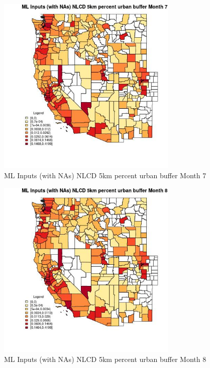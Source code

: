 \clearpage 

\begin{figure} 
\centering  
\includegraphics[width=0.77\textwidth]{Code_Outputs/Report_ML_input_PM25_Step4_part_e_de_duplicated_aves_compiled_2019-05-21wNAs_CountyNLCD_5km_percent_urban_buffermedianMonth7.jpg} 
\caption{\label{fig:Report_ML_input_PM25_Step4_part_e_de_duplicated_aves_compiled_2019-05-21wNAsCountyNLCD_5km_percent_urban_buffermedianMonth7}ML Inputs (with NAs) NLCD 5km percent urban buffer Month 7} 
\end{figure} 
 

\begin{figure} 
\centering  
\includegraphics[width=0.77\textwidth]{Code_Outputs/Report_ML_input_PM25_Step4_part_e_de_duplicated_aves_compiled_2019-05-21wNAs_CountyNLCD_5km_percent_urban_buffermedianMonth8.jpg} 
\caption{\label{fig:Report_ML_input_PM25_Step4_part_e_de_duplicated_aves_compiled_2019-05-21wNAsCountyNLCD_5km_percent_urban_buffermedianMonth8}ML Inputs (with NAs) NLCD 5km percent urban buffer Month 8} 
\end{figure} 
 

